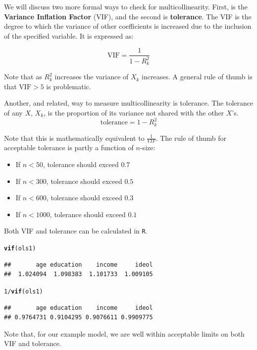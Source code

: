 \documentclass[11pt,openany]{book}\usepackage[]{graphicx}\usepackage[]{color}
\makeatletter
\newcommand{\hlnum}[1]{\textcolor[rgb]{0.686,0.059,0.569}{#1}}%
\newcommand{\hlopt}[1]{\textcolor[rgb]{0,0,0}{#1}}%
\newcommand{\hlstd}[1]{\textcolor[rgb]{0.345,0.345,0.345}{#1}}%
\newcommand{\hlkwd}[1]{\textcolor[rgb]{0.737,0.353,0.396}{\textbf{#1}}}%
\newenvironment{kframe}{%
 \def\at@end@of@kframe{}%
 \ifinner\ifhmode%
  \def\at@end@of@kframe{\end{minipage}}%
  \begin{minipage}{\columnwidth}%
 \fi\fi%
 \def\FrameCommand##1{\hskip\@totalleftmargin \hskip-\fboxsep
 \colorbox{shadecolor}{##1}\hskip-\fboxsep
     \hskip-\linewidth \hskip-\@totalleftmargin \hskip\columnwidth}%
 \MakeFramed {\advance\hsize-\width
   \@totalleftmargin\z@ \linewidth\hsize
   \@setminipage}}%
 {\par\unskip\endMakeFramed%
 \at@end@of@kframe}
\newenvironment{knitrout}{}{} %
\renewenvironment{knitrout}{\begin{singlespace}}{\end{singlespace}} %
\makeatother
\begin{document}
We will discuss two more formal ways to check for multicollinearity. First, is the  \textbf{Variance Inflation Factor} (VIF), and the second is \textbf{tolerance}. The VIF is the  degree to which the variance of other coefficients is increased due to the inclusion of the specified variable. It is expressed as: 

\begin{equation}
  \label{eq:vif}
  \text{VIF} = \frac{1}{1-R^2_k}
\end{equation}

\noindent Note that as $R^2_k$ increases the variance of $X_k$ increases. A general rule of thumb is that $\text{VIF} > 5$ is problematic. 

Another, and related, way to measure multicollinearity is tolerance. The tolerance of any $X$, $X_k$, is the proportion of its variance not shared with the other $X$'s. 
\begin{equation}
  \label{eq:tolerance}
  \text{tolerance} = 1-R^2_k 
\end{equation}

\noindent Note that this is mathematically equivalent to $\frac{1}{VIF}$. The rule of thumb for acceptable tolerance is partly a function of $n$-size:

 
\begin{itemize}
\item If $n < 50$, tolerance should exceed $0.7$
\item If $n < 300$, tolerance should exceed $0.5$
\item If $n < 600$, tolerance should exceed $0.3$
\item If $n < 1000$, tolerance should exceed $0.1$
\end{itemize}



Both VIF and tolerance can be calculated in \texttt{R}. 
\begin{knitrout}
\color{fgcolor}\begin{kframe}
\begin{alltt}
\hlkwd{vif}\hlstd{(ols1)}
\end{alltt}
\begin{verbatim}
##       age education    income     ideol 
##  1.024094  1.098383  1.101733  1.009105
\end{verbatim}
\begin{alltt}
\hlnum{1}\hlopt{/}\hlkwd{vif}\hlstd{(ols1)}
\end{alltt}
\begin{verbatim}
##       age education    income     ideol 
## 0.9764731 0.9104295 0.9076611 0.9909775
\end{verbatim}
\end{kframe}
\end{knitrout}
\noindent Note that, for our example model, we are well within acceptable limits on both VIF and tolerance. 
\end{document}
